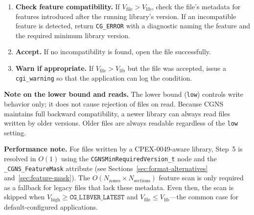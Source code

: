 \documentclass[11pt,letterpaper]{article}
\begin{document}
\begin{enumerate}[leftmargin=2em]
  \textbf{Read-only leniency (open question).}  This strict enforcement
  may be overly restrictive for \texttt{CG\_MODE\_READ} when the user
  does not know in advance what version the file was written with.  A
  user who sets \texttt{high} to restrict write output may not intend
  to also reject readable files.  Two relaxation strategies are
  possible: (a)~apply \texttt{high} only to write modes and always
  allow feature-aware reads regardless of \texttt{high}, or (b)~issue
  a \texttt{cgi\_warning} instead of \texttt{CG\_ERROR} for read-only
  opens when $V_{\mathrm{file}} > V_{\mathrm{high}}$ but no
  incompatible features are detected.  Option~(a) is simpler but means
  \texttt{high} has no read-time effect; option~(b) preserves the
  safety net while avoiding false rejections.  The committee should
  decide whether the current strict behavior is appropriate for
  read-only use cases.
\item \textbf{Check feature compatibility.}  If
  $V_{\mathrm{file}} > V_{\mathrm{lib}}$, check the file's
  metadata for features introduced after the running library's
  version.  If an incompatible feature is detected, return
  \texttt{CG\_ERROR} with a diagnostic naming the feature and the
  required minimum library version.
\item \textbf{Accept.}  If no incompatibility is found, open the file
  successfully.
\item \textbf{Warn if appropriate.}  If $V_{\mathrm{file}} >
  V_{\mathrm{lib}}$ but the file was accepted, issue a
  \texttt{cgi\_warning} so that the application can log the condition.
\end{enumerate}

\textbf{Note on the lower bound and reads.}  The lower bound
(\texttt{low}) controls write behavior only; it does not cause
rejection of files on read.  Because CGNS maintains full backward
compatibility, a newer library can always read files written by older
versions.  Older files are always readable regardless of the
\texttt{low} setting.

\textbf{Performance note.}  For files written by a CPEX-0049-aware
library, Step~5 is resolved in $O(1)$ using the
\texttt{CGNSMinRequiredVersion\_t} node and the
\texttt{\_CGNS\_FeatureMask} attribute (see
Sections~\ref{sec:format-alternatives} and~\ref{sec:feature-mask}).  The $O(N_{\mathrm{zones}} \times
N_{\mathrm{sections}})$ feature scan is only required as a fallback
for legacy files that lack these metadata.  Even then, the scan is
skipped when $V_{\mathrm{high}} \geq \texttt{CG\_LIBVER\_LATEST}$
and $V_{\mathrm{file}} \leq V_{\mathrm{lib}}$---the common case for
default-configured applications.
\end{document}
